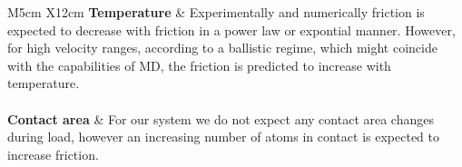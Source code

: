 \begin{table}[H]
\begin{center}
\begin{tabular}{  M{5cm}  X{12cm} }
  \textbf{Temperature} & Experimentally and numerically friction is expected to decrease with friction in a power law or expontial manner. However, for high velocity ranges, according to a ballistic regime, which might coincide with the capabilities of \acrshort{MD}, the friction is predicted to increase with temperature. \\ \\
  \textbf{Contact area} & For our system we do not expect any contact area changes during load, however an increasing number of atoms in contact is expected to increase friction.  \\
  \hline
  \end{tabular}
  \end{center}
\end{table}






